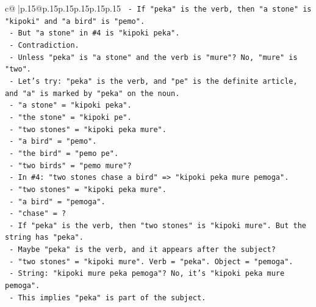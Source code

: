\documentclass{article}
\begin{document}
{\begin{supertabular}{c@{$\;$}|p{.15\linewidth}@{}p{.15\linewidth}p{.15\linewidth}p{.15\linewidth}p{.15\linewidth}p{.15\linewidth}}
{{{\texttt{                            {-} If "peka" is the verb, then "a stone" is "kipoki" and "a bird" is "pemo".} \\
\texttt{                            {-} But "a stone" in \#4 is "kipoki peka".} \\
\texttt{                            {-} Contradiction.} \\
\texttt{                            {-} Unless "peka" is "a stone" and the verb is "mure"? No, "mure" is "two".} \\
\texttt{                            {-} Let's try: "peka" is the verb, and "pe" is the definite article, and "a" is marked by "peka" on the noun.} \\
\texttt{                            {-} "a stone" = "kipoki peka".} \\
\texttt{                            {-} "the stone" = "kipoki pe".} \\
\texttt{                            {-} "two stones" = "kipoki peka mure".} \\
\texttt{                            {-} "a bird" = "pemo".} \\
\texttt{                            {-} "the bird" = "pemo pe".} \\
\texttt{                            {-} "two birds" = "pemo mure"?} \\
\texttt{                            {-} In \#4: "two stones chase a bird" => "kipoki peka mure pemoga".} \\
\texttt{                              {-} "two stones" = "kipoki peka mure".} \\
\texttt{                              {-} "a bird" = "pemoga".} \\
\texttt{                              {-} "chase" = ?} \\
\texttt{                              {-} If "peka" is the verb, then "two stones" is "kipoki mure". But the string has "peka".} \\
\texttt{                              {-} Maybe "peka" is the verb, and it appears after the subject?} \\
\texttt{                              {-} "two stones" = "kipoki mure". Verb = "peka". Object = "pemoga".} \\
\texttt{                              {-} String: "kipoki mure peka pemoga"? No, it's "kipoki peka mure pemoga".} \\
\texttt{                              {-} This implies "peka" is part of the subject.} \\
}}}
\end{supertabular}}
\end{document}

